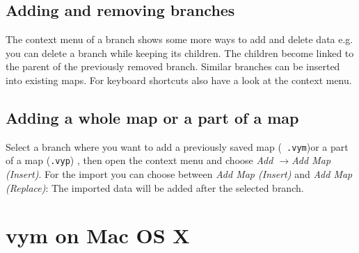 \documentclass[12pt,a4paper]{article}
\newcommand{\vym}{{\sc vym }}
\newcommand{\ra}{$\longrightarrow$}
\begin{document}
\subsection{Adding and removing branches}
The context menu of a branch shows some more ways to add and delete data
e.g. you can delete a branch while keeping its children. The children
become linked to the parent of the previously removed branch.  Similar
branches can be inserted into existing maps. For keyboard shortcuts also
have a look at the context menu.

\subsection{Adding a whole map or a part of a map}
Select a branch where you want to add a previously saved map ({\tt
.vym})or a part of a map ({\tt .vyp}) , then open the context menu and
choose {\em Add \ra Add Map (Insert)}. For the import you can choose
between {\em Add Map (Insert)} and {\em Add Map (Replace)}: The imported
data will be added after the selected branch.

\section{\vym on Mac OS X}


    
\end{document}
